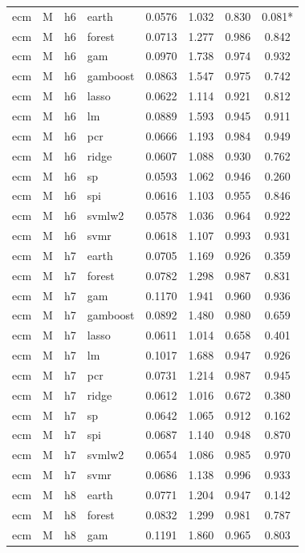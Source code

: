 \begin{ThreePartTable}
\begin{longtable}[t]{llclcccc}
\addlinespace
ecm & M & h6 & earth & 0.0576 & 1.032 & 0.830 & 0.081*\\
ecm & M & h6 & forest & 0.0713 & 1.277 & 0.986 & 0.842\\
ecm & M & h6 & gam & 0.0970 & 1.738 & 0.974 & 0.932\\
ecm & M & h6 & gamboost & 0.0863 & 1.547 & 0.975 & 0.742\\
ecm & M & h6 & lasso & 0.0622 & 1.114 & 0.921 & 0.812\\
ecm & M & h6 & lm & 0.0889 & 1.593 & 0.945 & 0.911\\
ecm & M & h6 & pcr & 0.0666 & 1.193 & 0.984 & 0.949\\
ecm & M & h6 & ridge & 0.0607 & 1.088 & 0.930 & 0.762\\
ecm & M & h6 & sp & 0.0593 & 1.062 & 0.946 & 0.260\\
ecm & M & h6 & spi & 0.0616 & 1.103 & 0.955 & 0.846\\
ecm & M & h6 & svmlw2 & 0.0578 & 1.036 & 0.964 & 0.922\\
ecm & M & h6 & svmr & 0.0618 & 1.107 & 0.993 & 0.931\\
\addlinespace
ecm & M & h7 & earth & 0.0705 & 1.169 & 0.926 & 0.359\\
ecm & M & h7 & forest & 0.0782 & 1.298 & 0.987 & 0.831\\
ecm & M & h7 & gam & 0.1170 & 1.941 & 0.960 & 0.936\\
ecm & M & h7 & gamboost & 0.0892 & 1.480 & 0.980 & 0.659\\
ecm & M & h7 & lasso & 0.0611 & 1.014 & 0.658 & 0.401\\
ecm & M & h7 & lm & 0.1017 & 1.688 & 0.947 & 0.926\\
ecm & M & h7 & pcr & 0.0731 & 1.214 & 0.987 & 0.945\\
ecm & M & h7 & ridge & 0.0612 & 1.016 & 0.672 & 0.380\\
ecm & M & h7 & sp & 0.0642 & 1.065 & 0.912 & 0.162\\
ecm & M & h7 & spi & 0.0687 & 1.140 & 0.948 & 0.870\\
ecm & M & h7 & svmlw2 & 0.0654 & 1.086 & 0.985 & 0.970\\
ecm & M & h7 & svmr & 0.0686 & 1.138 & 0.996 & 0.933\\
\addlinespace
ecm & M & h8 & earth & 0.0771 & 1.204 & 0.947 & 0.142\\
ecm & M & h8 & forest & 0.0832 & 1.299 & 0.981 & 0.787\\
ecm & M & h8 & gam & 0.1191 & 1.860 & 0.965 & 0.803\\

\end{longtable}
\end{ThreePartTable}
